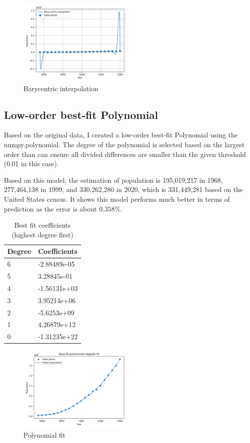 \documentclass[11pt]{article}
\begin{document}
\begin{figure}[H]
    \centering
    \includegraphics[width=0.5\textwidth]{interpolation_barycentric}
    \caption{Barycentric interpolation}
    \label{interpolation}
\end{figure}


\subsection{Low-order best-fit Polynomial}
Based on the original data, I created a low-order best-fit Polynomial using the numpy.polynomial. The degree of the polynomial is selected based on the largest order than can ensure all divided differences are smaller than the given threshold (0.01 in this case). 

Based on this model, the estimation of population is 195,019,217 in 1968, 277,464,138 in 1999, and 330,262,280 in 2020, which is 331,449,281 based on the United States census. It shows this model performs much better in terms of prediction as the error is about $0.358\%$.
\begin{table}[H]
    \centering
    \begin{tabular}{ll}
        \toprule
        Degree & Coefficients \\
        \midrule
        6 & -2.88489e-05 \\
        5 & 3.28845e-01 \\
        4 &  -1.56131e+03 \\
        3 & 3.95214e+06 \\
        2 & -5.6253e+09 \\
        1 & 4.26879e+12 \\
        0 & -1.31235e+22 \\
        \bottomrule
    \end{tabular}
    \caption{Best fit coefficients (highest degree first)}
\end{table}

\begin{figure}[H]
    \centering
    \includegraphics[width=0.5\textwidth]{polynomial_fit}
    \caption{Polynomial fit}
    \label{fit}
\end{figure}
\end{document}
